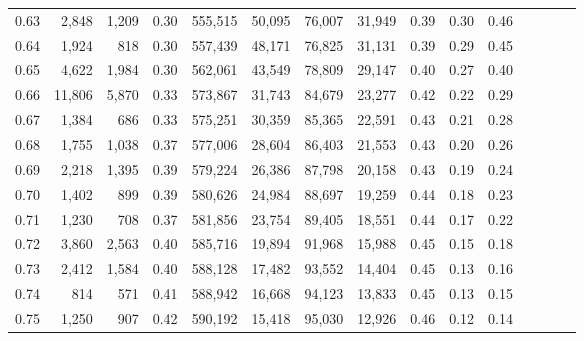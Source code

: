 \begin{tabular}{rrrcrrrrrrrrrrr}
0.63 &   2,848 &  1,209 &                                       0.30 &  555,515 &   50,095 &   76,007 &   31,949 &  0.39 &  0.30 &                         0.46 \\
0.64 &   1,924 &    818 &                                       0.30 &  557,439 &   48,171 &   76,825 &   31,131 &  0.39 &  0.29 &                         0.45 \\
0.65 &   4,622 &  1,984 &                                       0.30 &  562,061 &   43,549 &   78,809 &   29,147 &  0.40 &  0.27 &                         0.40 \\
0.66 &  11,806 &  5,870 &                                       0.33 &  573,867 &   31,743 &   84,679 &   23,277 &  0.42 &  0.22 &                         0.29 \\
0.67 &   1,384 &    686 &                                       0.33 &  575,251 &   30,359 &   85,365 &   22,591 &  0.43 &  0.21 &                         0.28 \\
0.68 &   1,755 &  1,038 &                                       0.37 &  577,006 &   28,604 &   86,403 &   21,553 &  0.43 &  0.20 &                         0.26 \\
0.69 &   2,218 &  1,395 &                                       0.39 &  579,224 &   26,386 &   87,798 &   20,158 &  0.43 &  0.19 &                         0.24 \\
0.70 &   1,402 &    899 &                                       0.39 &  580,626 &   24,984 &   88,697 &   19,259 &  0.44 &  0.18 &                         0.23 \\
0.71 &   1,230 &    708 &                                       0.37 &  581,856 &   23,754 &   89,405 &   18,551 &  0.44 &  0.17 &                         0.22 \\
0.72 &   3,860 &  2,563 &                                       0.40 &  585,716 &   19,894 &   91,968 &   15,988 &  0.45 &  0.15 &                         0.18 \\
0.73 &   2,412 &  1,584 &                                       0.40 &  588,128 &   17,482 &   93,552 &   14,404 &  0.45 &  0.13 &                         0.16 \\
0.74 &     814 &    571 &                                       0.41 &  588,942 &   16,668 &   94,123 &   13,833 &  0.45 &  0.13 &                         0.15 \\
0.75 &   1,250 &    907 &                                       0.42 &  590,192 &   15,418 &   95,030 &   12,926 &  0.46 &  0.12 &                         0.14 \\

\end{tabular}
